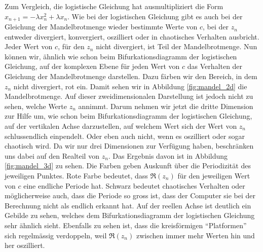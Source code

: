 Zum Vergleich, die logistische Gleichung hat ausmultipliziert
die Form $x_{n+1} = -\lambda x_n^2 +\lambda x_n$. 
Wie bei der logistischen Gleichung gibt es auch
bei der Gleichung der Mandelbrotmenge wieder bestimmte
Werte von $c$, bei der $z_n$ entweder 
divergiert, 
konvergiert, 
oszilliert 
oder in chaotisches Verhalten ausbricht. 
Jeder Wert von $c$, für den $z_n$ nicht 
divergiert, ist Teil der Mandelbrotmenge. 
Nun können wir, ähnlich wie schon beim 
Bifurkationsdiagramm der logistischen Gleichung, auf der
komplexen Ebene für jeden Wert von $c$ das Verhalten
der Gleichung der Mandelbrotmenge darstellen. 
Dazu färben wir den Bereich, in dem $z_n$ 
nicht divergiert, rot ein.
Damit sehen wir in Abbildung \ref{fig:mandel_2d}
die Mandelbrotmenge. 
Auf dieser zweidimensionalen Darstellung ist jedoch nicht zu sehen, 
welche Werte $z_n$ annimmt.
Darum nehmen wir jetzt die dritte Dimension zur Hilfe um,
wie schon beim Bifurkationsdiagramm der logistischen Gleichung,
auf der vertikalen Achse darzustellen, 
auf welchem Wert sich der Wert von $z_n$ schlussendlich einpendelt.
Oder eben auch nicht, wenn es oszilliert oder sogar
chaotisch wird. 
Da wir nur drei Dimensionen zur Verfügung haben,
beschränken uns dabei auf den Realteil von $z_n$. 
Das Ergebnis davon ist in Abbildung 
\ref{fig:mandel_3d}
zu sehen. 
Die Farben geben Auskunft über die Periodizität des 
jeweiligen Punktes. 
Rote Farbe bedeutet, dass $\Re(z_n)$
für den jeweiligen Wert von $c$ eine endliche 
Periode hat. 
Schwarz bedeutet chaotisches Verhalten 
oder möglicherweise auch,
dass die Periode so gross ist, dass der Computer
sie bei der Berechnung nicht als endlich erkannt hat.
Auf der reellen Achse ist deutlich ein Gebilde zu sehen,
welches dem Bifurkationsdiagramm der logistischen
Gleichung sehr ähnlich sieht. 
Ebenfalls zu sehen ist, dass die kreisförmigen
``Platformen'' sich regelmässig verdoppeln, weil
$\Re(z_n)$ zwischen immer mehr Werten hin und her oszilliert.

